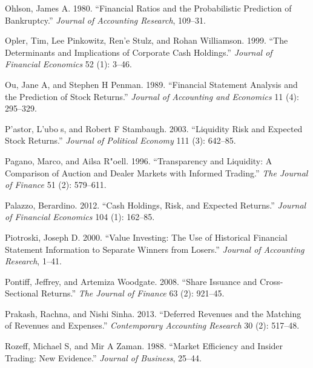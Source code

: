 \documentclass[
  letterpaper,
  DIV=11,
  numbers=noendperiod]{scrreprt}
\newlength{\cslhangindent}
\newlength{\cslentryspacingunit} %
\newenvironment{CSLReferences}[2] %
 {%
  \setlength{\parindent}{0pt}
  \ifodd #1
  \let\oldpar\par
  \def\par{\hangindent=\cslhangindent\oldpar}
  \fi
  \setlength{\parskip}{#2\cslentryspacingunit}
 }%
 {}
\begin{document}
\begin{CSLReferences}{1}{0}
\leavevmode{}%
Ohlson, James A. 1980. {``Financial Ratios and the Probabilistic
Prediction of Bankruptcy.''} \emph{Journal of Accounting Research},
109--31.

\leavevmode{}%
Opler, Tim, Lee Pinkowitz, Ren'e Stulz, and Rohan Williamson. 1999.
{``The Determinants and Implications of Corporate Cash Holdings.''}
\emph{Journal of Financial Economics} 52 (1): 3--46.

\leavevmode{}%
Ou, Jane A, and Stephen H Penman. 1989. {``Financial Statement Analysis
and the Prediction of Stock Returns.''} \emph{Journal of Accounting and
Economics} 11 (4): 295--329.

\leavevmode{}%
P'astor, L'ubos, and Robert F Stambaugh. 2003. {``Liquidity Risk and
Expected Stock Returns.''} \emph{Journal of Political Economy} 111 (3):
642--85.

\leavevmode{}%
Pagano, Marco, and Ailsa R"oell. 1996. {``Transparency and Liquidity: A
Comparison of Auction and Dealer Markets with Informed Trading.''}
\emph{The Journal of Finance} 51 (2): 579--611.

\leavevmode{}%
Palazzo, Berardino. 2012. {``Cash Holdings, Risk, and Expected
Returns.''} \emph{Journal of Financial Economics} 104 (1): 162--85.

\leavevmode{}%
Piotroski, Joseph D. 2000. {``Value Investing: The Use of Historical
Financial Statement Information to Separate Winners from Losers.''}
\emph{Journal of Accounting Research}, 1--41.

\leavevmode{}%
Pontiff, Jeffrey, and Artemiza Woodgate. 2008. {``Share Issuance and
Cross-Sectional Returns.''} \emph{The Journal of Finance} 63 (2):
921--45.

\leavevmode{}%
Prakash, Rachna, and Nishi Sinha. 2013. {``Deferred Revenues and the
Matching of Revenues and Expenses.''} \emph{Contemporary Accounting
Research} 30 (2): 517--48.

\leavevmode{}%
Rozeff, Michael S, and Mir A Zaman. 1988. {``Market Efficiency and
Insider Trading: New Evidence.''} \emph{Journal of Business}, 25--44.


\end{CSLReferences}
\end{document}
